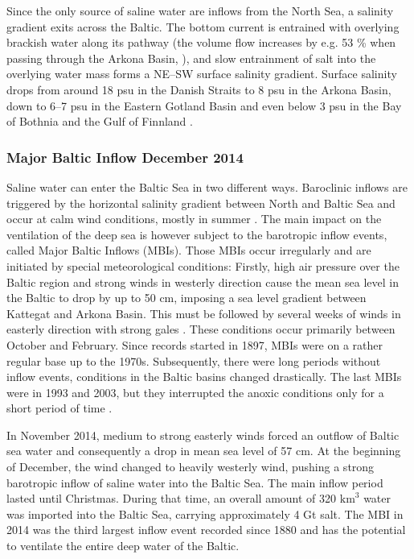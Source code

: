 Since the only source of saline water are inflows from the North Sea, a salinity gradient exits across the Baltic. The bottom current is entrained with overlying brackish water along its pathway (the volume flow increases by e.g. 53 \% when passing through the Arkona Basin, \citep[see][]{reissmann2009}), and slow entrainment of salt into the overlying water mass forms a NE--SW surface salinity gradient. Surface salinity drops from around 18 psu in the Danish Straits to 8 psu in the Arkona Basin, down to 6--7 psu in the Eastern Gotland Basin and even below 3 psu in the Bay of Bothnia and the Gulf of Finnland \citep[][]{balticsea}.

\subsubsection{Major Baltic Inflow December 2014}

Saline water can enter the Baltic Sea in two different ways. Baroclinic inflows are triggered by the horizontal salinity gradient between North and Baltic Sea and occur at calm wind conditions, mostly in summer \citep[][]{reissmann2009}. The main impact on the ventilation of the deep sea is however subject to the barotropic inflow events, called Major Baltic Inflows (MBIs). Those MBIs occur irregularly and are initiated by special meteorological conditions: Firstly, high air pressure over the Baltic region and strong winds in westerly direction cause the mean sea level in the Baltic to drop by up to 50 cm, imposing a sea level gradient between Kattegat and Arkona Basin. This must be followed by several weeks of winds in easterly direction with strong gales \citep[][]{balticsea, reissmann2009, mohrholz2015}.
These conditions occur primarily between October and February. Since records started in 1897, MBIs were on a rather regular base up to the 1970s. Subsequently, there were long periods without inflow events, conditions in the Baltic basins changed drastically. The last MBIs were in 1993 and 2003, but they interrupted the anoxic conditions only for a short period of time \citep[][]{schinke1998, mohrholz2015}.

In November 2014, medium to strong easterly winds forced an outflow of Baltic sea water and consequently a drop in mean sea level of 57 cm. At the beginning of December, the wind changed to heavily westerly wind, pushing a strong barotropic inflow of saline water into the Baltic Sea. The main inflow period lasted until Christmas. During that time, an overall amount of 320 $\text{km}^3$ water was imported into the Baltic Sea, carrying approximately 4 Gt salt. The MBI in 2014 was the third largest inflow event recorded since 1880 and has the potential to ventilate the entire deep water of the Baltic. 

